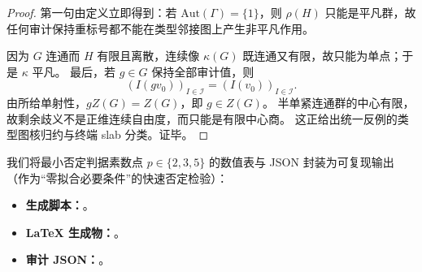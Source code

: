 \begin{proof}
第一句由定义立即得到：若 \(\mathrm{Aut}(\Gamma)=\{1\}\)，则 \(\rho(H)\) 只能是平凡群，故任何审计保持重标号都不能在类型邻接图上产生非平凡作用。

因为 \(G\) 连通而 \(H\) 有限且离散，连续像 \(\kappa(G)\) 既连通又有限，故只能为单点；于是 \(\kappa\) 平凡。
最后，若 \(g\in G\) 保持全部审计值，则
\[
(I(gv_0))_{I\in\mathcal I}=(I(v_0))_{I\in\mathcal I}.
\]
由所给单射性，\(gZ(G)=Z(G)\)，即 \(g\in Z(G)\)。
半单紧连通群的中心有限，故剩余歧义不是正维连续自由度，而只能是有限中心商。
这正给出统一反例的类型图核归约与终端 slab 分类。证毕。
\end{proof}

\par
我们将最小否定判据素数点 \(p\in\{2,3,5\}\) 的数值表与 JSON 封装为可复现输出（作为“零拟合必要条件”的快速否定检验）：
\begin{itemize}
  \item \textbf{生成脚本：}\texttt{}。
  \item \textbf{LaTeX 生成物：}\texttt{}。
  \item \textbf{审计 JSON：}\texttt{}。
\end{itemize}
